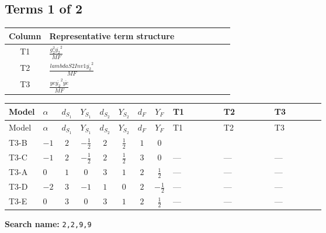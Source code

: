 \documentclass[8pt]{article}
\begin{document}
\begin{landscape}
\subsection*{Terms 1 of 2}
\begin{center}
\begin{tabular}{@{}c >{\raggedright\arraybackslash}p{0.82\linewidth}@{}}
\toprule
Column & Representative term structure \\
\midrule
T1 & \(\displaystyle \frac{g_{2}^{2} \overline{y_{2}}^{2}}{MF}\) \\
\midrule
T2 & \(\displaystyle \frac{lambdaS2Inv1 \overline{y_{2}}^{2}}{MF}\) \\
\midrule
T3 & \(\displaystyle \frac{ye \overline{y_{2}}^{2} \overline{ye}}{MF}\) \\
\midrule
\bottomrule
\end{tabular}
\end{center}
\smallskip
\tiny
\begin{longtable}{@{}llcccccc >{\raggedright\arraybackslash}p{0.21\linewidth} >{\raggedright\arraybackslash}p{0.21\linewidth} >{\raggedright\arraybackslash}p{0.21\linewidth}@{}}
\toprule
Model & $\alpha$ & $d_{S_1}$ & $Y_{S_1}$ & $d_{S_2}$ & $Y_{S_2}$ & $d_F$ & $Y_F$ & T1 & T2 & T3 \\
\midrule
\endfirsthead
\toprule
Model & $\alpha$ & $d_{S_1}$ & $Y_{S_1}$ & $d_{S_2}$ & $Y_{S_2}$ & $d_F$ & $Y_F$ & T1 & T2 & T3 \\
\midrule
\endhead
T3-B & $-1$ & $2$ & $-\frac{1}{2}$ & $2$ & $\frac{1}{2}$ & $1$ & $0$ & \scriptsize\adjustbox{max width=\linewidth}{$\begin{gathered} - \frac{3 g_{2}^{2} \overline{y_{2}}^{2}}{4 MF}\end{gathered}$} & \scriptsize\adjustbox{max width=\linewidth}{$\begin{gathered} - \frac{lambdaS2Inv1 \overline{y_{2}}^{2}}{2 MF}\end{gathered}$} & \scriptsize\adjustbox{max width=\linewidth}{$\begin{gathered} \frac{ye \overline{y_{2}}^{2} \overline{ye}}{4 MF}\end{gathered}$} \\
\midrule
T3-C & $-1$ & $2$ & $-\frac{1}{2}$ & $2$ & $\frac{1}{2}$ & $3$ & $0$ & --- & --- & --- \\
\midrule
T3-A & $0$ & $1$ & $0$ & $3$ & $1$ & $2$ & $\frac{1}{2}$ & --- & --- & --- \\
\midrule
T3-D & $-2$ & $3$ & $-1$ & $1$ & $0$ & $2$ & $-\frac{1}{2}$ & --- & --- & --- \\
\midrule
T3-E & $0$ & $3$ & $0$ & $3$ & $1$ & $2$ & $\frac{1}{2}$ & --- & --- & --- \\
\midrule
\bottomrule
\end{longtable}
\clearpage
\noindent\textbf{Search name: }\texttt{2,2,9,9}\par\smallskip

\end{landscape}
\end{document}
